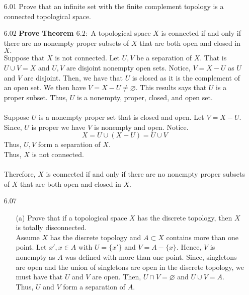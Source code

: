 \documentclass[12pt]{article}
\begin{document}
	\pagestyle{fancy}  
	\lfoot{} \cfoot{} \rfoot{}
	
	\begin{enumerate}
		\item[6.01] Prove that an infinite set with the finite complement topology is a connected
		topological space.\\
		
		
		\item[6.02] \textbf{Prove Theorem $6.2 :$} A topological space $X$ is connected if and only if there are no nonempty proper subsets of $X$ that are both open and closed in $X .$\\
		Suppose that $ X $ is not connected. Let $ U,V $ be a separation of $ X $. That is $ U\cup V = X$ and $ U,V $ are disjoint nonempty open sets. Notice, $ V=X-U  $ as $ U $ and $ V $ are disjoint. Then, we have that $ U $ is closed as it is the complement of an open set. We then have $ V=X-U\not= \varnothing $. This results says that $ U $ is a proper subset. Thus, $ U $ is a nonempty, proper, closed, and open set.\\
		\\
		Suppose $ U$ is a nonempty proper set that is closed and open. Let $ V=X-U $. Since, $ U $ is proper we have $ V $ is nonempty and open. Notice.
			\[X=U\cup(X-U)=U\cup V\]
		Thus, $ U,V $ form a separation of $ X $.\\
		Thus, $ X $ is not connected.\\
		\\
		Therefore, $X$ is connected if and only if there are no nonempty proper subsets of $X$ that are both open and closed in $X .$\\
		\item[6.07] \begin{enumerate}
			\item[(a)]  Prove that if a topological space $X$ has the discrete topology, then $X$ is totally disconnected.\\
			Assume $ X $ has the discrete topology and $ A\subset X $ contains more than one point. Let $ x',x\in A $ with $ U=\{x'\} $ and  $V = A-\{x\} $. Hence, $ V $ is nonempty as $ A $ was defined with more than one point. Since, singletons are open and the union of singletons are open in the discrete topology, we must have that $ U $ and $ V $ are open. Then, $ U\cap V = \varnothing $ and $ U\cup V = A $. \\
			Thus, $ U $ and $ V $ form a separation of $ A $.\\

\end{enumerate}
\end{enumerate}
\end{document}
